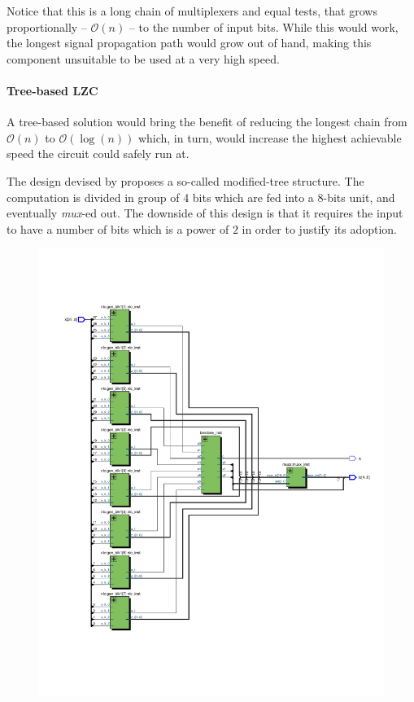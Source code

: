 Notice that this is a long chain of multiplexers and equal tests, that grows proportionally -- $\mathcal{O}(n)$ -- to the number of input bits. While this would work, the longest signal propagation path would grow out of hand, making this component unsuitable to be used at a very high speed.

\paragraph{Tree-based LZC}

A tree-based solution would bring the benefit of reducing the longest chain from $\mathcal{O}(n)$ to $\mathcal{O}(\log(n))$ which, in turn, would increase the highest achievable speed the circuit could safely run at.


The design devised by \cite{milenkovic_modular_2015} proposes a so-called modified-tree structure. The computation is divided in group of 4 bits which are fed into a 8-bits unit, and eventually \textit{mux}-ed out.
The downside of this design is that it requires the input to have a number of bits which is a power of $2$ in order to justify its adoption.

\begin{figure}
        \centering
        \includegraphics[width=\textwidth]{figures/milenkovic_quartus1.pdf}
\end{figure}

